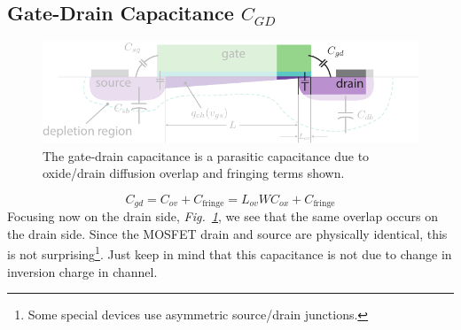 \subsection{Gate-Drain Capacitance \texorpdfstring{$C_{GD}$}{}}
\begin{figure}[b]
\centering
\includegraphics[width=.75\columnwidth]{mos_caps_Cgd}
\caption{The gate-drain capacitance is a parasitic capacitance due to oxide/drain diffusion overlap and fringing terms shown.}
\label{fig:mos_caps_Cgd}
\end{figure}
    \begin{equation}
        C_{gd} = C_{ov} + C_{\text{fringe}} = L_{ov} W C_{ox} + C_{\text{fringe}}
    \end{equation}
Focusing now on the drain side, \emph{Fig.~\ref{fig:mos_caps_Cgd}}, we see that the same overlap occurs on the drain side.  Since the MOSFET drain and source are physically identical, this is not surprising\footnote{Some special devices use asymmetric source/drain junctions.}.  Just keep in mind that this capacitance is not due to change in inversion charge in channel.
